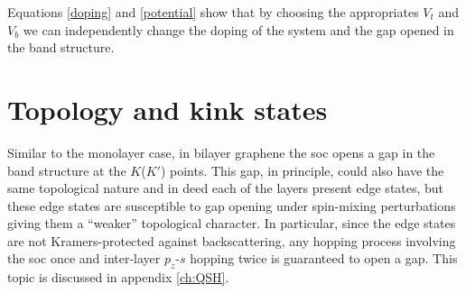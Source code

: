 Equations \eqref{doping} and \eqref{potential} show that by choosing the        appropriates $V_t$ and $V_b$ we can independently change the doping of the      system and the gap opened in the band structure.








\section{Topology and kink states}
Similar to the monolayer case, in bilayer graphene the \ac{soc} opens a gap in the band structure at the $K$($K'$) points. This gap, in principle, could also have the same topological nature and in deed each of the layers present edge states, but these edge states are susceptible to gap opening under spin-mixing perturbations\cite{Prada2011} giving them a ``weaker'' topological character. In particular, since the edge states are not Kramers-protected against backscattering, any hopping process involving the \ac{soc} once and inter-layer $p_z$-$s$ hopping twice is guaranteed to open a gap. This topic is discussed in appendix \ref{ch:QSH}.
\smallskip


